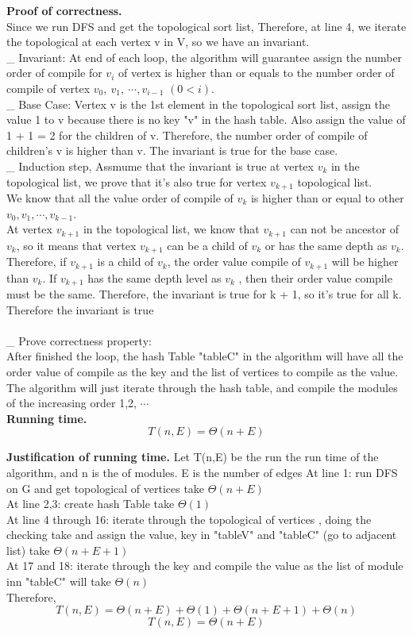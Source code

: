 \documentclass[11pt]{article}
\begin{document}
\noindent
\textbf{Proof of correctness.}\\
Since we run DFS and get the topological sort list, Therefore, at line 4, we iterate the topological at each vertex v in V, so we have an invariant.\\
\_ Invariant: At end of each loop, the algorithm will guarantee assign the number order of compile for $v_i$ of vertex is higher than or equals to the number order of compile of vertex $v_0,\ v_1,\ \cdots, v_{i-1}$ $(0 < i )$.\\
\_ Base Case: Vertex v is the 1st element in the topological sort list, assign the value 1 to v because there is no key "v" in the hash table. Also assign the value of 1 + 1 = 2 for the children of v. Therefore, the number order of compile of children's v is higher than v. The invariant is true for the base case.\\
\_ Induction step, Assmume that the invariant is true at vertex $v_k$ in the topological list, we prove that it's also true for vertex $v_{k+1}$ topological list.\\
We know that all the value order of compile of $v_k$ is higher than or equal to other $v_0, v_1,\cdots, v_{k-1}$.\\
At vertex $v_{k+1}$ in the topological list, we know that $v_{k+1}$ can not be ancestor of $v_k$, so it means that vertex $v_{k+1}$ can be a child of $v_k$ or has the same depth as $v_k$. Therefore, if $v_{k+1}$ is a child of $v_k$, the order value compile of $v_{k+1}$ will be higher than $v_k$. If $v_{k+1}$ has the same depth level as $v_k$ , then their order value compile must be the same. Therefore, the invariant is true for k + 1, so it's true for all k. Therefore the invariant is true \\
\\
\_ Prove correctness property:\\
After finished the loop, the hash Table "tableC" in the algorithm will have all the order value of compile as the key and the list of vertices to compile as the value. The algorithm will just iterate through the hash table, and compile the modules of the increasing order 1,2, $\cdots$\\

\noindent
\textbf{Running time.}
$$\boxed{T(n,E) = \Theta(n + E)}$$


\noindent
\textbf{Justification of running time.}
Let T(n,E) be the run the run time of the algorithm, and n is the  of modules. E is the number of edges
At line 1: run DFS on G and get topological of vertices take $\Theta(n + E)$\\
At line 2,3: create hash Table take $\Theta(1)$\\
At line 4 through 16: iterate through the topological of vertices , doing the checking take and assign the value, key in "tableV" and "tableC" (go to adjacent list) take $\Theta(n + E+ 1)$\\
At 17 and 18: iterate through the key and compile the value as the list of module inn "tableC" will take $\Theta(n)$\\
Therefore,
$$T(n,E) = \Theta(n + E) + \Theta(1) + \Theta(n + E + 1) + \Theta(n)$$
$$\boxed{T(n,E) = \Theta(n + E)}$$
\end{document}
